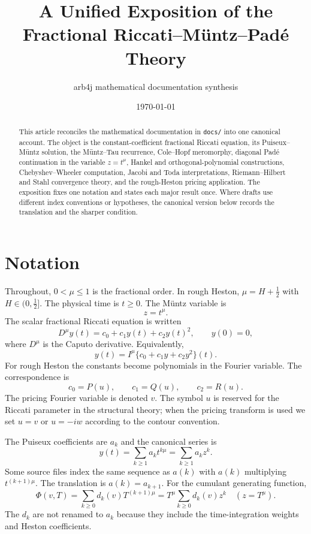 \documentclass[11pt]{article}
\title{A Unified Exposition of the Fractional Riccati--Müntz--Padé Theory}
\author{arb4j mathematical documentation synthesis}
\date{\today}
\theoremstyle{definition}
\begin{document}
\maketitle

\begin{abstract}
This article reconciles the mathematical documentation in \texttt{docs/} into one canonical account.
The object is the constant-coefficient fractional Riccati equation,
its Puiseux--Müntz solution,
the Müntz--Tau recurrence,
Cole--Hopf meromorphy,
diagonal Padé continuation in the variable $z=t^{\mu}$,
Hankel and orthogonal-polynomial constructions,
Chebyshev--Wheeler computation,
Jacobi and Toda interpretations,
Riemann--Hilbert and Stahl convergence theory,
and the rough-Heston pricing application.
The exposition fixes one notation and states each major result once.
Where drafts use different index conventions or hypotheses,
the canonical version below records the translation and the sharper condition.
\end{abstract}

\tableofcontents

\section*{Notation}

Throughout,
$0<\mu\le 1$ is the fractional order.
In rough Heston, $\mu=H+\tfrac12$ with $H\in(0,\tfrac12]$.
The physical time is $t\ge0$.
The Müntz variable is
\[
        z=t^{\mu}.
\]
The scalar fractional Riccati equation is written
\begin{equation}\label{eq:canonical-riccati}
        D^{\mu}y(t)=c_0+c_1y(t)+c_2y(t)^2,
        \qquad y(0)=0,
\end{equation}
where $D^{\mu}$ is the Caputo derivative.
Equivalently,
\begin{equation}\label{eq:canonical-volterra}
        y(t)=I^{\mu}\{c_0+c_1y+c_2y^2\}(t).
\end{equation}
For rough Heston the constants become polynomials in the Fourier variable.
The correspondence is
\[
        c_0=P(u),\qquad c_1=Q(u),\qquad c_2=R(u).
\]
The pricing Fourier variable is denoted $v$.
The symbol $u$ is reserved for the Riccati parameter in the structural theory;
when the pricing transform is used we set $u=v$ or $u=-iw$ according to the contour convention.

The Puiseux coefficients are $a_k$ and the canonical series is
\begin{equation}\label{eq:ak-series}
        y(t)=\sum_{k\ge1}a_k t^{k\mu}
        =\sum_{k\ge1}a_k z^k.
\end{equation}
Some source files index the same sequence as $a(k)$ with $a(k)$ multiplying $t^{(k+1)\mu}$.
The translation is $a(k)=a_{k+1}$.
For the cumulant generating function,
\begin{equation}\label{eq:dk-series}
        \Phi(v,T)=\sum_{k\ge0} d_k(v) T^{(k+1)\mu}
        =T^{\mu}\sum_{k\ge0} d_k(v) z^k
        \quad (z=T^{\mu}).
\end{equation}
The $d_k$ are not renamed to $a_k$ because they include the time-integration weights and Heston coefficients.
\end{document}
